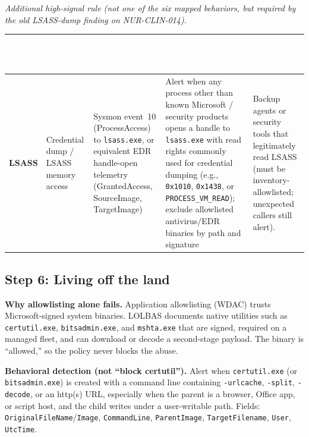 \documentclass[11pt,letterpaper]{article}
\renewcommand{\arraystretch}{1.28}
\newcommand{\labtablesetup}{%
  \small
  \setlength{\tabcolsep}{6pt}%
  \renewcommand{\arraystretch}{1.45}%
}
\begin{document}
\noindent\textit{Additional high-signal rule (not one of the six mapped behaviors, but required by the old LSASS-dump finding on NUR-CLIN-014).}

\begingroup\labtablesetup
\begin{tabularx}{\textwidth}{@{}>{\bfseries\centering\arraybackslash}p{0.9cm} >{\RaggedRight\arraybackslash}p{2.0cm} >{\RaggedRight\arraybackslash}p{2.35cm} >{\RaggedRight\arraybackslash}X >{\RaggedRight\arraybackslash}X@{}}
\toprule
\rowcolor{tblhead}
\textcolor{white}{\textbf{\#}} &
\textcolor{white}{\textbf{Focus}} &
\textcolor{white}{\textbf{Telemetry Required}} &
\textcolor{white}{\textbf{Detection Logic}} &
\textcolor{white}{\textbf{Expected False Positive}} \\
\midrule
LSASS & Credential dump / LSASS memory access
  & Sysmon event~10 (ProcessAccess) to \texttt{lsass.exe}, or equivalent EDR handle-open telemetry (GrantedAccess, SourceImage, TargetImage)
  & Alert when any process other than known Microsoft / security products opens a handle to \texttt{lsass.exe} with read rights commonly used for credential dumping (e.g., \texttt{0x1010}, \texttt{0x1438}, or \texttt{PROCESS\_VM\_READ}); exclude allowlisted antivirus/EDR binaries by path and signature
  & Backup agents or security tools that legitimately read LSASS (must be inventory-allowlisted; unexpected callers still alert). \\
\bottomrule
\end{tabularx}
\endgroup

\subsection*{Step 6: Living off the land}

\textbf{Why allowlisting alone fails.}
Application allowlisting (WDAC) trusts Microsoft-signed system binaries. LOLBAS documents native utilities such as \texttt{certutil.exe}, \texttt{bitsadmin.exe}, and \texttt{mshta.exe} that are signed, required on a managed fleet, and can download or decode a second-stage payload. The binary is ``allowed,'' so the policy never blocks the abuse.

\textbf{Behavioral detection (not ``block certutil'').}
Alert when \texttt{certutil.exe} (or \texttt{bitsadmin.exe}) is created with a command line containing \texttt{-urlcache}, \texttt{-split}, \texttt{-decode}, or an http(s) URL, especially when the parent is a browser, Office app, or script host, and the child writes under a user-writable path. Fields: \texttt{OriginalFileName}/\texttt{Image}, \texttt{CommandLine}, \texttt{ParentImage}, \texttt{TargetFilename}, \texttt{User}, \texttt{UtcTime}.
\end{document}

